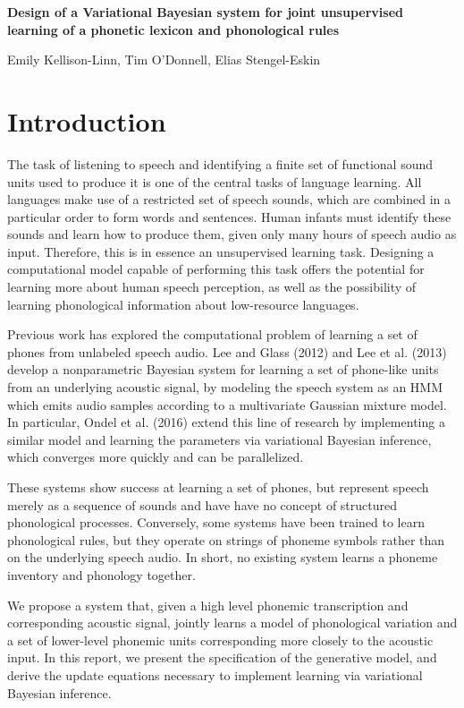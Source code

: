 \documentclass[11pt]{article}
\begin{document}
\begin{center}
	
	{\Large \textbf{Design of a Variational Bayesian system for joint unsupervised learning of a phonetic lexicon and phonological rules}}

	{\normalsize Emily Kellison-Linn, Tim O'Donnell, Elias Stengel-Eskin}
			
\end{center}

\section{Introduction}

The task of listening to speech and identifying a finite set of functional sound units used to produce it is one of the central tasks of language learning. All languages make use of a restricted set of speech sounds, which are combined in a particular order to form words and sentences. Human infants must identify these sounds and learn how to produce them, given only many hours of speech audio as input. Therefore, this is in essence an unsupervised learning task. Designing a computational model capable of performing this task offers the potential for learning more about human speech perception, as well as the possibility of learning phonological information about low-resource languages.

Previous work has explored the computational problem of learning a set of phones from unlabeled speech audio. Lee and Glass (2012) and Lee et al. (2013) develop a nonparametric Bayesian system for learning a set of phone-like units from an underlying acoustic signal, by modeling the speech system as an HMM which emits audio samples according to a multivariate Gaussian mixture model. In particular, Ondel et al. (2016) extend this line of research by implementing a similar model and learning the parameters via variational Bayesian inference, which converges more quickly and can be parallelized.
 
These systems show success at learning a set of phones, but represent speech merely as a sequence of sounds and have have no concept of structured phonological processes. Conversely, some systems have been trained to learn phonological rules, but they operate on strings of phoneme symbols rather than on the underlying speech audio. In short, no existing system learns a phoneme inventory and phonology together.

We propose a system that, given a high level phonemic transcription and corresponding acoustic signal, jointly learns a model of phonological variation and a set of lower-level phonemic units corresponding more closely to the acoustic input. In this report, we present the specification of the generative model, and derive the update equations necessary to implement learning via variational Bayesian inference.
\end{document}
